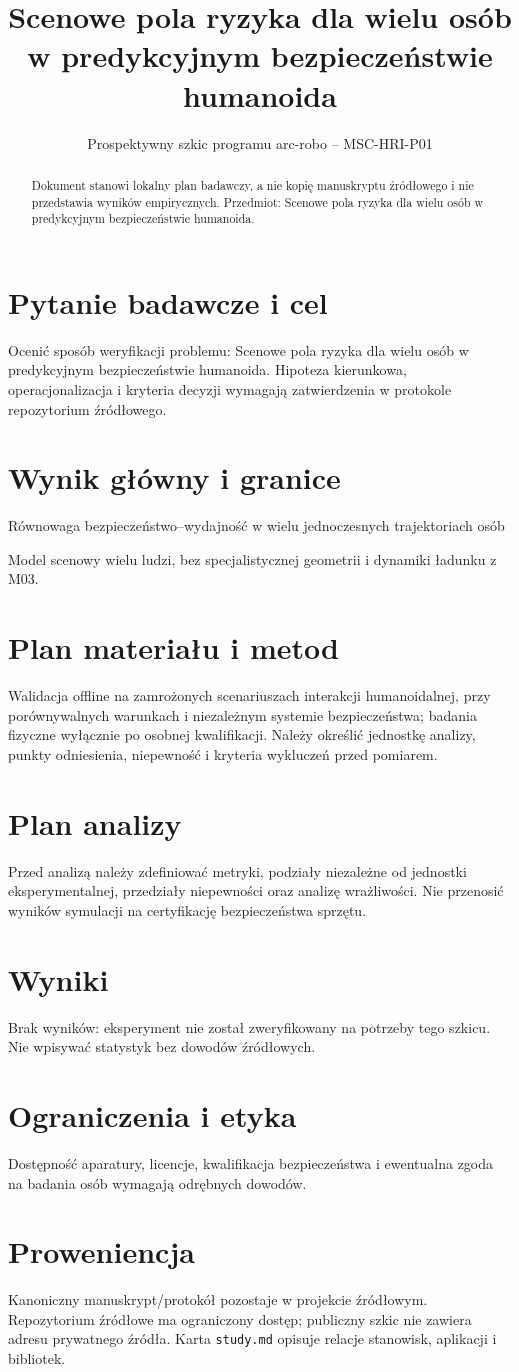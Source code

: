 \documentclass[11pt,a4paper]{article}
\title{Scenowe pola ryzyka dla wielu osób w predykcyjnym bezpieczeństwie humanoida}
\author{}
\date{Prospektywny szkic programu arc-robo -- MSC-HRI-P01}
\begin{document}
\maketitle
\begin{abstract}
Dokument stanowi lokalny plan badawczy, a nie kopię manuskryptu źródłowego i nie przedstawia wyników empirycznych. Przedmiot: Scenowe pola ryzyka dla wielu osób w predykcyjnym bezpieczeństwie humanoida.
\end{abstract}
\section{Pytanie badawcze i cel}
Ocenić sposób weryfikacji problemu: Scenowe pola ryzyka dla wielu osób w predykcyjnym bezpieczeństwie humanoida. Hipoteza kierunkowa, operacjonalizacja i kryteria decyzji wymagają zatwierdzenia w protokole repozytorium źródłowego.
\section{Wynik główny i granice}
Równowaga bezpieczeństwo–wydajność w wielu jednoczesnych trajektoriach osób

Model scenowy wielu ludzi, bez specjalistycznej geometrii i dynamiki ładunku z M03.
\section{Plan materiału i metod}
Walidacja offline na zamrożonych scenariuszach interakcji humanoidalnej, przy porównywalnych warunkach i niezależnym systemie bezpieczeństwa; badania fizyczne wyłącznie po osobnej kwalifikacji. Należy określić jednostkę analizy, punkty odniesienia, niepewność i kryteria wykluczeń przed pomiarem.
\section{Plan analizy}
Przed analizą należy zdefiniować metryki, podziały niezależne od jednostki eksperymentalnej, przedziały niepewności oraz analizę wrażliwości. Nie przenosić wyników symulacji na certyfikację bezpieczeństwa sprzętu.
\section{Wyniki}
Brak wyników: eksperyment nie został zweryfikowany na potrzeby tego szkicu. Nie wpisywać statystyk bez dowodów źródłowych.
\section{Ograniczenia i etyka}
Dostępność aparatury, licencje, kwalifikacja bezpieczeństwa i ewentualna zgoda na badania osób wymagają odrębnych dowodów.
\section{Proweniencja}
Kanoniczny manuskrypt/protokół pozostaje w projekcie źródłowym. Repozytorium źródłowe ma ograniczony dostęp; publiczny szkic nie zawiera adresu prywatnego źródła. Karta \texttt{study.md} opisuje relacje stanowisk, aplikacji i bibliotek.
\end{document}
